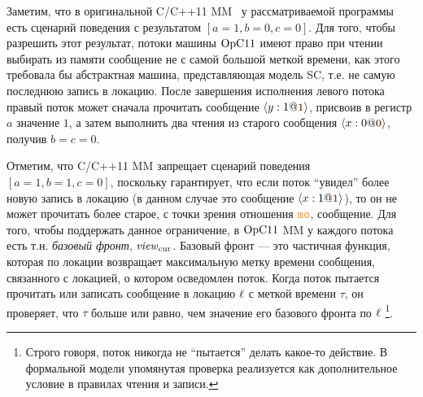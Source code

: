 Заметим, что в оригинальной C/C++11 MM~\cite{Batty-al:POPL11} у рассматриваемой программы есть сценарий поведения
с результатом $[a = 1, b = 0, c = 0]$.
Для того, чтобы разрешить этот результат,
потоки машины $\mathrm{OpC11}$ имеют право при чтении выбирать из памяти
сообщение не с самой большой меткой времени,
как этого требовала бы абстрактная машина, представляющая модель SC, т.е.
не самую последнюю запись в локацию.
После завершения исполнения левого потока
правый поток может сначала прочитать сообщение $\angled{y:1@\tstamp{1}}$,
присвоив в регистр $a$ значение $1$,
а затем выполнить два чтения из старого сообщения $\angled{x:0@\tstamp{0}}$,
получив $b = c = 0$.

Отметим, что C/C++11 MM запрещает сценарий поведения
$[a = 1, b = 1, c = 0]$, поскольку гарантирует, что если поток
``увидел'' более новую запись в локацию
(в данном случае это сообщение $\angled{x:1@\tstamp{1}}$),
то он не может прочитать более старое, с точки зрения отношения $\lMO$, сообщение.
Для того, чтобы поддержать данное ограничение, в $\mathrm{OpC11}$ MM у каждого потока есть
т.н. \emph{базовый фронт}, $\mathit{view}_{\mathrm{cur}}$.
Базовый фронт --- это частичная функция, которая по локации возвращает
максимальную метку времени сообщения, связанного с локацией,
о котором осведомлен поток.
Когда поток пытается прочитать или записать сообщение в локацию $\ell$ с меткой времени $\tau$,
он проверяет, что $\tau$ больше или равно, чем значение его базового фронта по
$\ell$%
\footnote{
Строго говоря, поток никогда не ``пытается'' делать какое-то действие.
В формальной модели упомянутая проверка реализуется как дополнительное условие в
правилах чтения и записи.
}.


